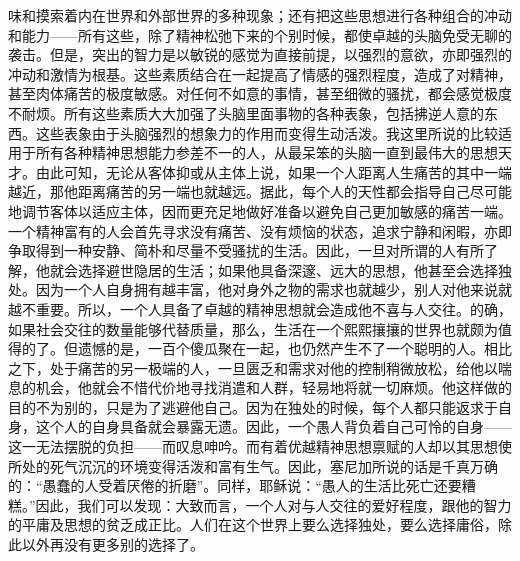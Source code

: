 \documentclass[12pt,oneside]{book}
\begin{document}
味和摸索着内在世界和外部世界的多种现象；还有把这些思想进行各种组合的冲动和能力——所有这些，除了精神松弛下来的个别时候，都使卓越的头脑免受无聊的袭击。但是，突出的智力是以敏锐的感觉为直接前提，以强烈的意欲，亦即强烈的冲动和激情为根基。这些素质结合在一起提高了情感的强烈程度，造成了对精神，甚至肉体痛苦的极度敏感。对任何不如意的事情，甚至细微的骚扰，都会感觉极度不耐烦。所有这些素质大大加强了头脑里面事物的各种表象，包括拂逆人意的东西。这些表象由于头脑强烈的想象力的作用而变得生动活泼。我这里所说的比较适用于所有各种精神思想能力参差不一的人，从最呆笨的头脑一直到最伟大的思想天才。由此可知，无论从客体抑或从主体上说，如果一个人距离人生痛苦的其中一端越近，那他距离痛苦的另一端也就越远。据此，每个人的天性都会指导自己尽可能地调节客体以适应主体，因而更充足地做好准备以避免自己更加敏感的痛苦一端。一个精神富有的人会首先寻求没有痛苦、没有烦恼的状态，追求宁静和闲暇，亦即争取得到一种安静、简朴和尽量不受骚扰的生活。因此，一旦对所谓的人有所了解，他就会选择避世隐居的生活；如果他具备深邃、远大的思想，他甚至会选择独处。因为一个人自身拥有越丰富，他对身外之物的需求也就越少，别人对他来说就越不重要。所以，一个人具备了卓越的精神思想就会造成他不喜与人交往。的确，如果社会交往的数量能够代替质量，那么，生活在一个熙熙攘攘的世界也就颇为值得的了。但遗憾的是，一百个傻瓜聚在一起，也仍然产生不了一个聪明的人。相比之下，处于痛苦的另一极端的人，一旦匮乏和需求对他的控制稍微放松，给他以喘息的机会，他就会不惜代价地寻找消遣和人群，轻易地将就一切麻烦。他这样做的目的不为别的，只是为了逃避他自己。因为在独处的时候，每个人都只能返求于自身，这个人的自身具备就会暴露无遗。因此，一个愚人背负着自己可怜的自身——这一无法摆脱的负担——而叹息呻吟。而有着优越精神思想禀赋的人却以其思想使所处的死气沉沉的环境变得活泼和富有生气。因此，塞尼加所说的话是千真万确的：“愚蠢的人受着厌倦的折磨”。同样，耶稣说：“愚人的生活比死亡还要糟糕。”因此，我们可以发现：大致而言，一个人对与人交往的爱好程度，跟他的智力的平庸及思想的贫乏成正比。人们在这个世界上要么选择独处，要么选择庸俗，除此以外再没有更多别的选择了。 
\end{document}
